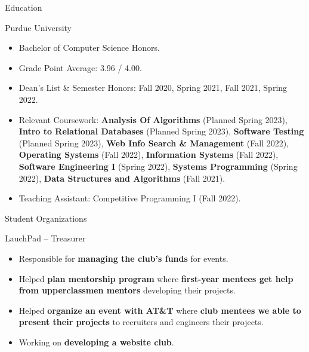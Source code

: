 \documentclass{article}
\newlength{\tabin}
\newlength{\secsep}
\newcommand{\lineunder}{\vspace*{-8pt} \\ \hspace*{-6pt} \hrulefill \\ \vspace*{-15pt}}
\newenvironment{tabbedsection}[1]{
  \begin{list}{}{
      \setlength{\itemsep}{0pt}
      \setlength{\labelsep}{0pt}
      \setlength{\labelwidth}{0pt}
      \setlength{\leftmargin}{\tabin}
      \setlength{\rightmargin}{\tabin}
      \setlength{\listparindent}{0pt}
      \setlength{\parsep}{0pt}
      \setlength{\parskip}{0pt}
      \setlength{\partopsep}{0pt}
      \setlength{\topsep}{#1}
    }
  \item[]
}{\end{list}}
\newenvironment{resume_section}[1]{
  \filbreak
  \vspace{2\secsep}
  \textsc{\large#1}
  \lineunder
  \begin{tabbedsection}{\secsep}
}{\end{tabbedsection}}
\newenvironment{resume_subsection}[2][]{
  \textbf{#2} \hfill {\footnotesize #1} \hspace{2em}
  \begin{tabbedsection}{0.5\secsep}
}{\end{tabbedsection}}
\newenvironment{subitems}{
  \renewcommand{\labelitemi}{-}
  \begin{itemize}
      \setlength{\labelsep}{1em}
}{\end{itemize}}
\begin{document}
\begin{resume_section}{Education}
  
  \begin{resume_subsection}{Purdue University}
    
    \begin{subitems}
      \item Bachelor of Computer Science Honors.
      \item Grade Point Average: 3.96 / 4.00.  	
  	  \item Dean's List \& Semester Honors: Fall 2020, Spring 2021, Fall 2021, Spring 2022.
  	  \item Relevant Coursework: \textbf{Analysis Of Algorithms} (Planned Spring 2023), \textbf{Intro to Relational Databases} (Planned Spring 2023), \textbf{Software Testing} (Planned Spring 2023), \textbf{Web Info Search \& Management} (Fall 2022), \textbf{Operating Systems} (Fall 2022), \textbf{Information Systems} (Fall 2022), \textbf{Software Engineering I} (Spring 2022), \textbf{Systems Programming} (Spring 2022), \textbf{Data Structures and Algorithms} (Fall 2021).
  	  \item Teaching Assistant: Competitive Programming I (Fall 2022).
	\end{subitems}  	
  	
  \end{resume_subsection}
  
\end{resume_section}

\begin{resume_section}{Student Organizations}

	\begin{resume_subsection}{LauchPad -- Treasurer}
    \begin{subitems}
		\item Responsible for \textbf{managing the club's funds} for events.
		\item Helped \textbf{plan mentorship program} where \textbf{first-year mentees get help from upperclassmen mentors} developing their projects.
		\item Helped \textbf{organize an event with AT\&T} where \textbf{club mentees we able to present their projects} to recruiters and engineers their projects.
		\item Working on \textbf{developing a website club}.
	\end{subitems}  
	\end{resume_subsection}
	
	
\end{resume_section}
\end{document}
